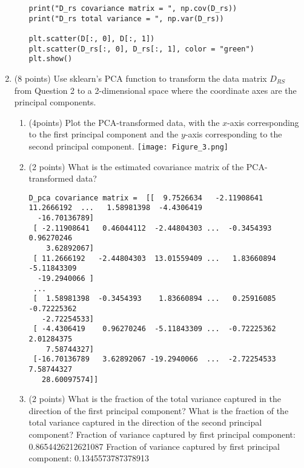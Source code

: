 \documentclass[11pt]{article}
\begin{document}
\begin{enumerate}
\begin{enumerate}
\begin{verbatim}
print("D_rs covariance matrix = ", np.cov(D_rs))
print("D_rs total variance = ", np.var(D_rs))

plt.scatter(D[:, 0], D[:, 1])
plt.scatter(D_rs[:, 0], D_rs[:, 1], color = "green")
plt.show()

    \end{verbatim}
    \newpage
    \end{enumerate}

    \item (8 points) Use sklearn’s PCA function to transform the data matrix
    $D_{RS}$ from Question 2 to a 2-dimensional space where the coordinate axes
    are the principal components.

    \begin{enumerate}

        \item (4points) Plot the PCA-transformed data, with the $x$-axis
        corresponding to the first principal component and the $y$-axis
        corresponding to the second principal component.
        \newline \texttt{[image: Figure\_3.png]}

        \item (2 points) What is the estimated covariance matrix of the
        PCA-transformed data?
         \begin{verbatim}
D_pca covariance matrix =  [[  9.7526634   -2.11908641  11.2666192  ...   1.58981398  -4.4306419
  -16.70136789]
 [ -2.11908641   0.46044112  -2.44804303 ...  -0.3454393    0.96270246
    3.62892067]
 [ 11.2666192   -2.44804303  13.01559409 ...   1.83660894  -5.11843309
  -19.2940066 ]
 ...
 [  1.58981398  -0.3454393    1.83660894 ...   0.25916085  -0.72225362
   -2.72254533]
 [ -4.4306419    0.96270246  -5.11843309 ...  -0.72225362   2.01284375
    7.58744327]
 [-16.70136789   3.62892067 -19.2940066  ...  -2.72254533   7.58744327
   28.60097574]]

        \end{verbatim}

        \item (2 points) What is the fraction of the total variance captured in
        the direction of the first principal component? What is the fraction of
        the total variance captured in the direction of the second principal
        component?
        \newline Fraction of variance captured by first principal component:  0.8654426212621087
        \newline Fraction of variance captured by first principal component:  0.1345573787378913 
        

\end{enumerate}
\end{enumerate}
\end{document}
